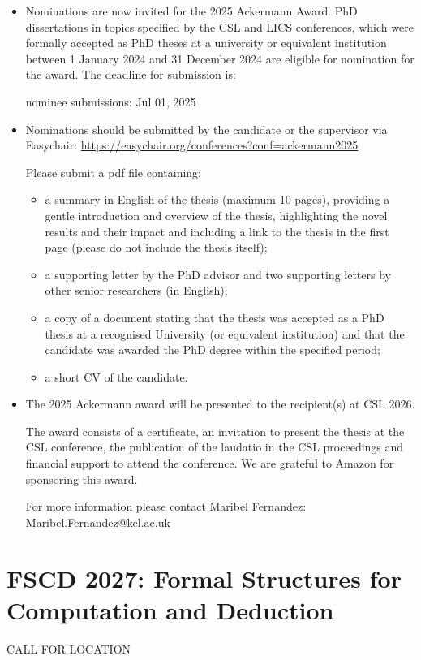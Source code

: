 \documentclass[prodmode,acmtecs]{acmsmall} %
\begin{document}
\begin{itemize}\item  Nominations are now invited for the 2025 Ackermann Award. PhD dissertations in topics specified by the CSL and LICS conferences, which were formally accepted as PhD theses at a university or equivalent institution between 1 January 2024 and 31 December 2024 are eligible for nomination for the award. The deadline for submission is: 
 
nominee submissions: Jul 01, 2025 
 
\item  Nominations should be submitted by the candidate or the supervisor via Easychair: \href{https://easychair.org/conferences?conf=ackermann2025}{https://easychair.org/conferences?conf=ackermann2025} 
 
  Please submit a pdf file containing: 
 
\begin{itemize}\item  a summary in English of the thesis (maximum 10 pages), providing a gentle introduction and overview of the thesis, highlighting the novel results and their impact and including a link to the thesis in the first page (please do not include the thesis itself); 
\item  a supporting letter by the PhD advisor and two supporting letters by other senior researchers (in English);
\item  a copy of a document stating that the thesis was accepted as a PhD thesis at a recognised University (or equivalent institution) and that the candidate was awarded the PhD degree within the specified period;
\item  a short CV of the candidate.
\end{itemize} 
\item  The 2025 Ackermann award will be presented to the recipient(s) at CSL 2026.  
 
  The award consists of a certificate, an invitation to present the thesis at the CSL conference, the publication of the laudatio in the CSL proceedings and financial support to attend the conference. We are grateful to Amazon for sponsoring this award. 
 
  For more information please contact Maribel Fernandez: Maribel.Fernandez@kcl.ac.uk 
 
\end{itemize}\section{FSCD 2027:  Formal Structures for Computation and Deduction}\label{FSCD2027}CALL FOR LOCATION 
\end{document}
